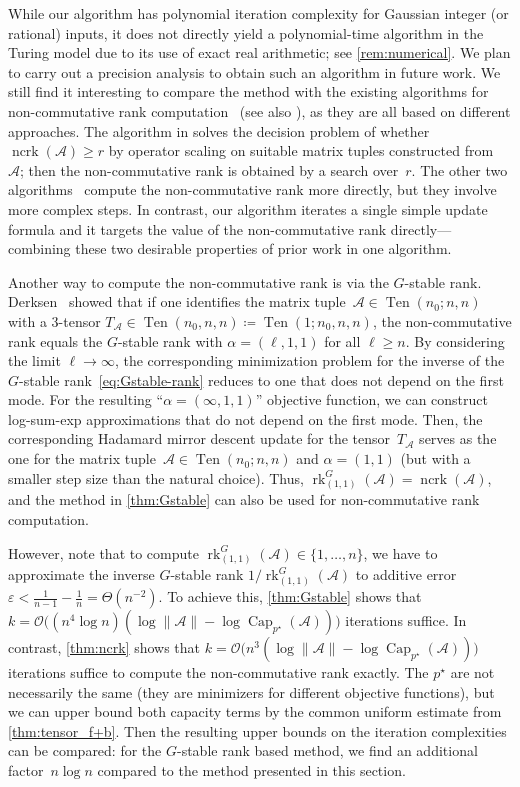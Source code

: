 \documentclass[11pt,letterpaper]{article}
\numberwithin{equation}{section}
\newcommand{\eps}{\varepsilon}
\DeclareMathOperator{\Capacity}{Cap}
\DeclareMathOperator{\rk}{rk}
\DeclareMathOperator{\ncrk}{ncrk}
\DeclareMathOperator{\Ten}{Ten}
\begin{document}
While our algorithm has polynomial iteration complexity for Gaussian integer (or rational) inputs, it does not directly yield a polynomial-time algorithm in the Turing model due to its use of exact real arithmetic; see \cref{rem:numerical}.
We plan to carry out a precision analysis to obtain such an algorithm in future work.
We still find it interesting to compare the method with the existing algorithms for non-commutative rank computation~\cite{GGOW20,IQS-18,Hamada-Hirai-21} (see also \cite{FSG-22}), as they are all based on different approaches.
The algorithm in \cite{GGOW20} solves the decision problem of whether $\ncrk(\mathcal{A}) \ge r$ by operator scaling on suitable matrix tuples constructed from~$\mathcal A$; then the non-commutative rank is obtained by a search over~$r$.
The other two algorithms~\cite{IQS-18,Hamada-Hirai-21} compute the non-commutative rank more directly, but they involve more complex steps.
In contrast, our algorithm iterates a single simple update formula and it targets the value of the non-commutative rank directly---combining these two desirable properties of prior work in one algorithm.

Another way to compute the non-commutative rank is via the $G$-stable rank.
Derksen~\cite[Prop.~2.9]{Derksen-22} showed that if one identifies the matrix tuple~$\mathcal A \in \Ten(n_0; n, n)$ with a $3$-tensor $T_{\mathcal A}\in \Ten(n_0, n, n) \coloneqq \Ten(1; n_0, n, n)$, the non-commutative rank equals the $G$-stable rank with $\alpha = (\ell, 1, 1)$ for all $\ell \ge n$.
By considering the limit $\ell \to \infty$, the corresponding minimization problem for the inverse of the $G$-stable rank~\eqref{eq:Gstable-rank} reduces to one that does not depend on the first mode.
For the resulting ``$\alpha = (\infty,1,1)$'' objective function, we can construct log-sum-exp approximations that do not depend on the first mode.
Then, the corresponding Hadamard mirror descent update for the tensor~$T_{\mathcal A}$ serves as the one for the matrix tuple~$\mathcal A\in\Ten(n_0; n, n)$ and $\alpha = (1, 1)$ (but with a smaller step size than the natural choice).
Thus, $\rk^G_{(1,1)}(\mathcal A) = \ncrk(\mathcal A)$, and the method in \cref{thm:Gstable} can also be used for non-commutative rank computation.

However, note that to compute $\rk^G_{(1,1)}(\mathcal A) \in \{1,\dots,n\}$, we have to approximate the inverse $G$-stable rank $1/\rk^G_{(1,1)}(\mathcal A)$ to additive error $\eps < \frac1{n-1} - \frac1n = \Theta(n^{-2})$.
To achieve this, \cref{thm:Gstable} shows that $k = \mathcal{O}\bigl((n^4 \log n) (\log\|\mathcal A\| - \log\Capacity_{p^\star}(\mathcal A))\bigr)$ iterations suffice.
In contrast, \cref{thm:ncrk} shows that $k = \mathcal{O}\bigl(n^3 (\log\|\mathcal A\| - \log\Capacity_{p^\star}(\mathcal A))\bigr)$ iterations suffice to compute the non-commutative rank exactly.
The $p^\star$ are not necessarily the same (they are minimizers for different objective functions), but we can upper bound both capacity terms by the common uniform estimate from \cref{thm:tensor_f+b}.
Then the resulting upper bounds on the iteration complexities can be compared: for the $G$-stable rank based method, we find an additional factor~$n \log n$ compared to the method presented in this section.
\end{document}

